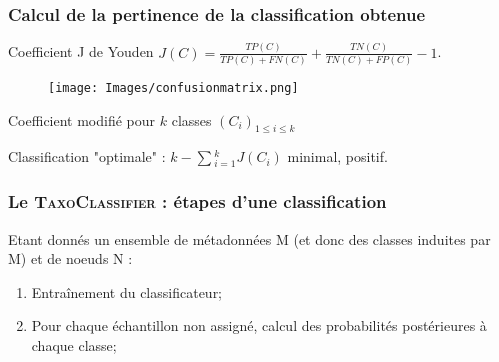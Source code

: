 \documentclass{beamer}
\begin{document}
\begin{frame}
\frametitle{Calcul de la pertinence de la classification obtenue}


\begin{block}{Coefficient J de Youden}
$J(C) = \frac{TP(C)}{TP(C) + FN(C)} + \frac{TN(C)}{TN(C) + FP(C)} - 1$.
\end{block}

\begin{figure}
\centering
\texttt{[image: Images/confusionmatrix.png]}
\end{figure}




\pause

\begin{block}{Coefficient \alert{modifié} pour $k$ classes $(C_{i})_{1 \le i \le k}$}
\begin{center}
Classification "optimale" : $k - \sum{_{i = 1}^{k}}{J(C_{i})}$ minimal, positif.
\end{center}
\end{block}

\end{frame}

\begin{frame}
\frametitle{Le \textsc{\bf TaxoClassifier} : étapes d'une classification}

Etant donnés un ensemble de métadonnées M (et donc des classes induites par M) et de noeuds N :
\pause
\bigskip
\begin{enumerate}
\item \alert{Entraînement} du classificateur;
\pause
\item Pour chaque échantillon non assigné, calcul des \alert{probabilités postérieures} à chaque classe;
\end{enumerate}
\end{frame}
\end{document}
